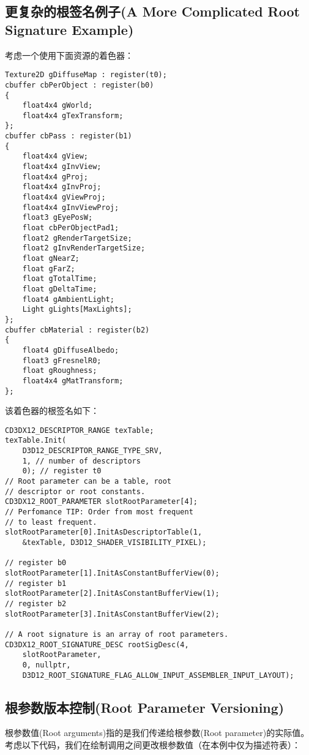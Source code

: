 \subsection{更复杂的根签名例子(A More Complicated Root Signature Example)}
\begin{flushleft}
考虑一个使用下面资源的着色器：\\
\end{flushleft}
\begin{lstlisting}
Texture2D gDiffuseMap : register(t0);
cbuffer cbPerObject : register(b0)
{
    float4x4 gWorld;
    float4x4 gTexTransform;
};
cbuffer cbPass : register(b1)
{
    float4x4 gView;
    float4x4 gInvView;
    float4x4 gProj;
    float4x4 gInvProj;
    float4x4 gViewProj;
    float4x4 gInvViewProj;
    float3 gEyePosW;
    float cbPerObjectPad1;
    float2 gRenderTargetSize;
    float2 gInvRenderTargetSize;
    float gNearZ;
    float gFarZ;
    float gTotalTime;
    float gDeltaTime;
    float4 gAmbientLight;
    Light gLights[MaxLights];
};
cbuffer cbMaterial : register(b2)
{
    float4 gDiffuseAlbedo;
    float3 gFresnelR0;
    float gRoughness;
    float4x4 gMatTransform;
};
\end{lstlisting}
\begin{flushleft}
该着色器的根签名如下：\\
\end{flushleft}
\begin{lstlisting}
CD3DX12_DESCRIPTOR_RANGE texTable;
texTable.Init(
    D3D12_DESCRIPTOR_RANGE_TYPE_SRV,
    1, // number of descriptors
    0); // register t0
// Root parameter can be a table, root 
// descriptor or root constants.
CD3DX12_ROOT_PARAMETER slotRootParameter[4];
// Perfomance TIP: Order from most frequent 
// to least frequent.
slotRootParameter[0].InitAsDescriptorTable(1,
    &texTable, D3D12_SHADER_VISIBILITY_PIXEL);

// register b0
slotRootParameter[1].InitAsConstantBufferView(0);
// register b1
slotRootParameter[2].InitAsConstantBufferView(1);
// register b2
slotRootParameter[3].InitAsConstantBufferView(2);

// A root signature is an array of root parameters.
CD3DX12_ROOT_SIGNATURE_DESC rootSigDesc(4,
    slotRootParameter,
    0, nullptr,
    D3D12_ROOT_SIGNATURE_FLAG_ALLOW_INPUT_ASSEMBLER_INPUT_LAYOUT);
\end{lstlisting}

\subsection{根参数版本控制(Root Parameter Versioning)}
\begin{flushleft}
根参数值(Root arguments)指的是我们传递给根参数(Root parameter)的实际值。 考虑以下代码，我们在绘制调用之间更改根参数值（在本例中仅为描述符表）：\\
\end{flushleft}

